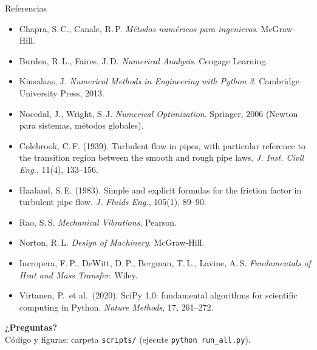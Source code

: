 \documentclass[aspectratio=169,11pt]{beamer}
\begin{document}
\begin{frame}{Referencias}
  \footnotesize
  \begin{itemize}
    \item Chapra, S.\,C., Canale, R.\,P. \emph{Métodos numéricos para ingenieros}. McGraw-Hill.
    \item Burden, R.\,L., Faires, J.\,D. \emph{Numerical Analysis}. Cengage Learning.
    \item Kiusalaas, J. \emph{Numerical Methods in Engineering with Python 3}. Cambridge University Press, 2013.
    \item Nocedal, J., Wright, S.\,J. \emph{Numerical Optimization}. Springer, 2006 (Newton para sistemas, métodos globales).
    \item Colebrook, C.\,F. (1939). Turbulent flow in pipes, with particular reference to the transition region between the smooth and rough pipe laws. \emph{J. Inst. Civil Eng.}, 11(4), 133--156.
    \item Haaland, S.\,E. (1983). Simple and explicit formulas for the friction factor in turbulent pipe flow. \emph{J. Fluids Eng.}, 105(1), 89--90.
    \item Rao, S.\,S. \emph{Mechanical Vibrations}. Pearson.
    \item Norton, R.\,L. \emph{Design of Machinery}. McGraw-Hill.
    \item Incropera, F.\,P., DeWitt, D.\,P., Bergman, T.\,L., Lavine, A.\,S. \emph{Fundamentals of Heat and Mass Transfer}. Wiley.
    \item Virtanen, P.\ et al.\ (2020). SciPy 1.0: fundamental algorithms for scientific computing in Python. \emph{Nature Methods}, 17, 261--272.
  \end{itemize}
\end{frame}

\begin{frame}
  \centering
  \vspace{1.5cm}
  {\Large\textbf{¿Preguntas?}}\\[1.2cm]
  \small Código y figuras: carpeta \texttt{scripts/} (ejecute \texttt{python run\_all.py}).
\end{frame}
\end{document}
